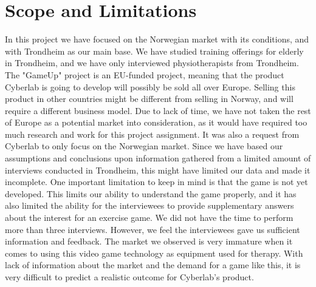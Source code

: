 \section{Scope and Limitations}
In this project we have focused on the Norwegian market with its conditions, and with Trondheim as our main base. We have studied training offerings for elderly in Trondheim, and we have only interviewed physiotherapists from Trondheim. The "GameUp" project is an EU-funded project, meaning that the product Cyberlab is going to develop will possibly be sold all over Europe. Selling this product in other countries might be different from selling in Norway, and will require a different business model. Due to lack of time, we have not taken the rest of Europe as a potential market into consideration, as it would have required too much research and work for this project assignment. It was also a request from Cyberlab to only focus on the Norwegian market. Since we have based our assumptions and conclusions upon information gathered from a limited amount of interviews conducted in Trondheim, this might have limited our data and made it incomplete. One important limitation to keep in mind is that the game is not yet developed. This limits our ability to understand the game properly, and it has also limited the ability for the interviewees to provide supplementary answers about the interest for an exercise game. We did not have the time to perform more than three interviews. However, we feel the interviewees gave us sufficient information and feedback. The market we observed is very immature when it comes to using this video game technology as equipment used for therapy. With lack of information about the market and the demand for a game like this, it is very difficult to predict a realistic outcome for Cyberlab’s product.

